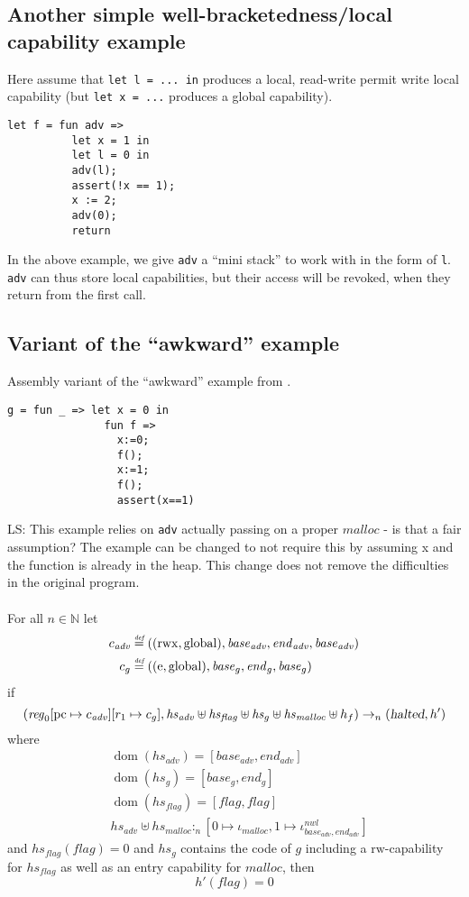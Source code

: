 \documentclass[a4paper]{article}
\newcommand{\forcenewline}{$\phantom{v}$\\}
\newcommand{\update}[2]{[#1 \mapsto #2]}
\newcommand{\defeq}{\stackrel{\textit{\tiny{def}}}{=}}
\DeclareMathOperator{\dom}{dom}
\newcommand\lau[1]{{\color{purple} \sf \footnotesize {LS: #1}}\\}
\newcommand{\var}[1]{\mathit{#1}}
\newcommand{\hs}{\var{hs}}
\newcommand{\pcreg}{\mathrm{pc}}
\newcommand{\start}{\var{base}}
\newcommand{\addrend}{\var{end}}
\newcommand{\reg}{\var{reg}}
\newcommand{\heap}{\var{heap}}
\newcommand{\adv}{\var{adv}}
\newcommand{\flag}{\var{flag}}
\newcommand{\halted}{\textsl{halted}}
\newcommand{\heapSat}[3][\heap]{#1 :_{#2} #3}
\newcommand{\codelabel}[1]{\mathit{#1}}
\newcommand{\malloc}{\codelabel{malloc}}
\newcommand{\nats}{\mathbb{N}}
\newcommand{\plainperm}[1]{\mathrm{#1}}
\newcommand{\readwrite}{\plainperm{rw}}
\newcommand{\entry}{\plainperm{e}}
\newcommand{\rwx}{\plainperm{rwx}}
\newcommand{\glob}{\plainperm{global}}
\newcommand{\step}[1][]{\rightarrow_{#1}}
\begin{document}
\subsection{Another simple well-bracketedness/local capability example}
Here assume that \texttt{let l = ... in} produces a local, read-write permit write local capability (but \texttt{let x = ...} produces a global capability). 
\begin{verbatim}
let f = fun adv =>
          let x = 1 in
          let l = 0 in
          adv(l);
          assert(!x == 1);
          x := 2;
          adv(0);
          return
\end{verbatim}
In the above example, we give \texttt{adv} a ``mini stack'' to work with in the form of \texttt{l}. \texttt{adv} can thus store local capabilities, but their access will be revoked, when they return from the first call.

\subsection{Variant of the ``awkward'' example}
Assembly variant of the ``awkward'' example from \citep[p.~11]{Dreyer:2010:IHS:1863543.1863566}. 
\begin{verbatim}
g = fun _ => let x = 0 in
               fun f =>
                 x:=0;
                 f();
                 x:=1;
                 f();
                 assert(x==1)
\end{verbatim}
\lau{ This example relies on \texttt{adv} actually passing on a proper $\malloc$ - is that a fair assumption? The example can be changed to not require this by assuming x and the function is already in the heap. This change does not remove the difficulties in the original program. }
\begin{lemma}\forcenewline
  For all $n \in \nats$
  let
  \begin{align*}
    c_{\var{adv}} & \defeq ((\rwx,\glob),\start_{\adv},\addrend_{\adv},\start_{\adv}) \\
    c_{g} & \defeq ((\entry,\glob),\start_g,\addrend_g,\start_g)
  \end{align*}
if
  \[
    (\reg_0\update{\pcreg}{c_{\adv}}
          \update{r_1}{c_g},\hs_{\adv} \uplus \hs_{\flag} \uplus \hs_{g} \uplus \hs_{\malloc} \uplus h_f) \step[n] (\halted,h')
  \]
where 
\begin{align*}
  &\dom(hs_{\adv}) = [\start_\adv,\addrend_\adv] \\
  &\dom(hs_g) = [\start_g,\addrend_g] \\
  &\dom(hs_\flag) = [\flag,\flag] \\
  &\heapSat[\hs_{\adv} \uplus \hs_{\malloc}]{n}{[0 \mapsto \iota_{\malloc}, 1 \mapsto\iota^{\var{nwl}}_{\start_\adv,\addrend_\adv}]}
\end{align*}
and $hs_\flag(\flag) = 0$ and $hs_g$ contains the code of $g$ including a $\readwrite$-capability for $\hs_\flag$ as well as an entry capability for $\malloc$, 
then
\[
  h'(\flag) = 0
\]
\end{lemma}
\end{document}
